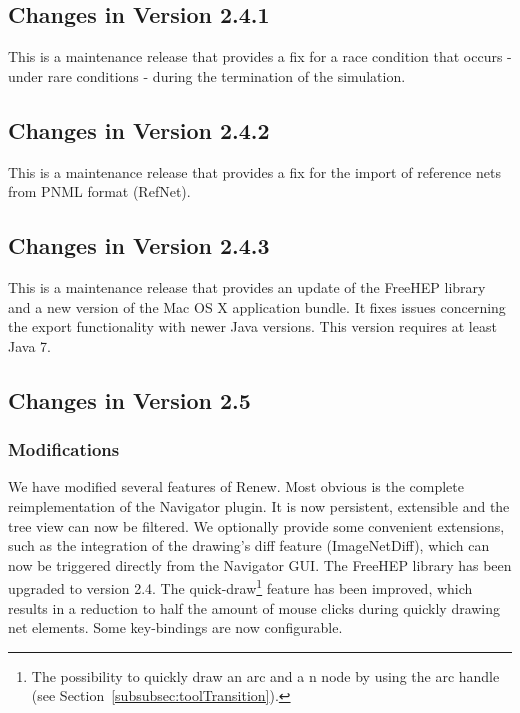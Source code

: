 \subsection{Changes in Version 2.4.1}

This is a maintenance release that provides a fix for a race condition
that occurs - under rare conditions - during the termination of the
simulation.


\subsection{Changes in Version 2.4.2}

This is a maintenance release that provides a fix for the import
of reference nets from PNML format (RefNet).


\subsection{Changes in Version 2.4.3}

This is a maintenance release that provides an update of the FreeHEP library
and a new version of the Mac OS X application bundle.
It fixes issues concerning the export functionality with newer Java versions.
This version requires at least Java 7.


\subsection{Changes in Version 2.5}

\subsubsection*{Modifications}

We have modified several features of Renew.
Most obvious is the complete reimplementation of the Navigator plugin. 
It is now persistent, extensible and the tree view can now be filtered.
We optionally provide some convenient extensions, 
such as the integration of the drawing's diff feature (ImageNetDiff), 
which can now be triggered directly from the Navigator GUI.
The FreeHEP library has been upgraded to version 2.4.
The quick-draw\footnote{The possibility to quickly draw an arc and a n
  node by using the arc handle (see
  Section~\ref{subsubsec:toolTransition}).}  feature has been
improved, which results in a reduction to half the amount of mouse
clicks during quickly drawing net elements.
Some key-bindings are now configurable.

